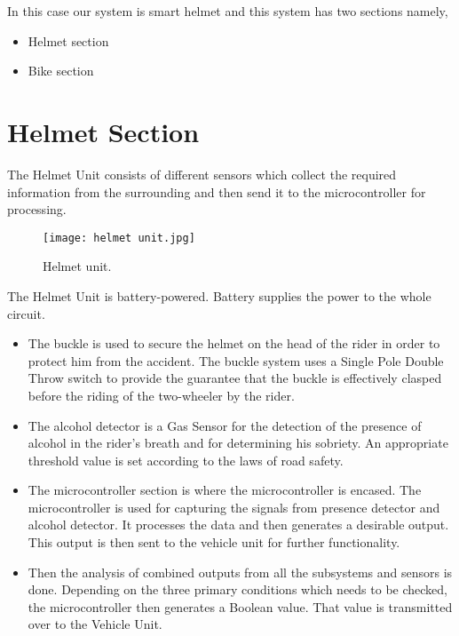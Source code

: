 In this case our system is smart helmet and this system has two sections namely,
\begin{itemize}
	\item Helmet section
	
	\item Bike section	
\end{itemize}
\section{Helmet Section}
The Helmet Unit consists of different sensors which collect the required information from the surrounding and then send it to the microcontroller for processing.
\vspace{.5cm}

\begin{figure}[h]
	\centering
	\texttt{[image: helmet unit.jpg]}
	\caption{Helmet unit.}
\end{figure}

The Helmet Unit is battery-powered. Battery supplies the power to the whole circuit.
\begin{itemize}
	
	\item The buckle is used to secure the helmet on the head of the rider in order to protect him from the accident. The buckle system uses a Single Pole Double Throw switch to provide the guarantee that the buckle is effectively clasped before the riding of the two-wheeler by the rider.
	
	\item The alcohol detector is a Gas Sensor for the detection of the presence of alcohol in the rider’s breath and for determining his sobriety. An appropriate threshold value is set according to the laws of road safety. 
	
	\item The microcontroller section is where the microcontroller is encased. The microcontroller is used for capturing the signals from presence detector and alcohol detector. It processes the data and then generates a desirable output. This output is then sent to the vehicle unit for further functionality.
	
	\item Then the analysis of combined outputs from all the subsystems and sensors is done. Depending on the three primary conditions which needs to be checked, the microcontroller then generates a Boolean value. That value is transmitted over to the Vehicle Unit.
\end{itemize}
\pagebreak

